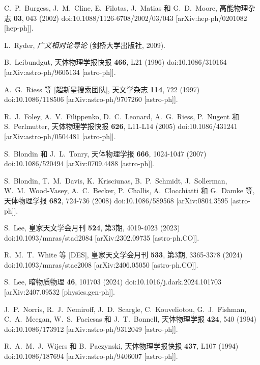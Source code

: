\documentclass[jkps,preprint,fleqn]{revtex4}
\begin{document}
\begin{CJK*}{UTF8}{gbsn}
\begin{thebibliography}{999}
C.~P.~Burgess, J.~M.~Cline, E.~Filotas, J.~Matias 和 G.~D.~Moore,  
高能物理杂志 \textbf{03}, 043 (2002)  
doi:10.1088/1126-6708/2002/03/043  
[arXiv:hep-ph/0201082 [hep-ph]].  

L.~Ryder, \textit{广义相对论导论} (剑桥大学出版社, 2009).  

B.~Leibundgut,  
天体物理学报快报 \textbf{466}, L21 (1996)  
doi:10.1086/310164  
[arXiv:astro-ph/9605134 [astro-ph]].  

A.~G.~Riess 等 [超新星搜索团队],  
天文学杂志 \textbf{114}, 722 (1997)  
doi:10.1086/118506  
[arXiv:astro-ph/9707260 [astro-ph]].  

R.~J.~Foley, A.~V.~Filippenko, D.~C.~Leonard, A.~G.~Riess, P.~Nugent 和 S.~Perlmutter,  
天体物理学报快报 \textbf{626}, L11-L14 (2005)  
doi:10.1086/431241  
[arXiv:astro-ph/0504481 [astro-ph]].  

S.~Blondin 和 J.~L.~Tonry,  
天体物理学报 \textbf{666}, 1024-1047 (2007)  
doi:10.1086/520494  
[arXiv:0709.4488 [astro-ph]].  

S.~Blondin, T.~M.~Davis, K.~Krisciunas, B.~P.~Schmidt, J.~Sollerman, W.~M.~Wood-Vasey, A.~C.~Becker, P.~Challis, A.~Clocchiatti 和 G.~Damke 等,  
天体物理学报 \textbf{682}, 724-736 (2008)  
doi:10.1086/589568  
[arXiv:0804.3595 [astro-ph]].  

S.~Lee,  
皇家天文学会月刊 \textbf{524}, 第3期, 4019-4023 (2023)  
doi:10.1093/mnras/stad2084  
[arXiv:2302.09735 [astro-ph.CO]].  

R.~M.~T.~White 等 [DES],  
皇家天文学会月刊 \textbf{533}, 第3期, 3365-3378 (2024)  
doi:10.1093/mnras/stae2008  
[arXiv:2406.05050 [astro-ph.CO]].  

S.~Lee,  
暗物质物理 \textbf{46}, 101703 (2024)  
doi:10.1016/j.dark.2024.101703  
[arXiv:2407.09532 [physics.gen-ph]].  

J.~P.~Norris, R.~J.~Nemiroff, J.~D.~Scargle, C.~Kouveliotou, G.~J.~Fishman, C.~A.~Meegan, W.~S.~Paciesas 和 J.~T.~Bonnell,  
天体物理学报 \textbf{424}, 540 (1994)  
doi:10.1086/173912  
[arXiv:astro-ph/9312049 [astro-ph]].  

R.~A.~M.~J.~Wijers 和 B.~Paczynski,  
天体物理学报快报 \textbf{437}, L107 (1994)  
doi:10.1086/187694  
[arXiv:astro-ph/9406007 [astro-ph]].  


\end{thebibliography}
\end{CJK*}
\end{document}
